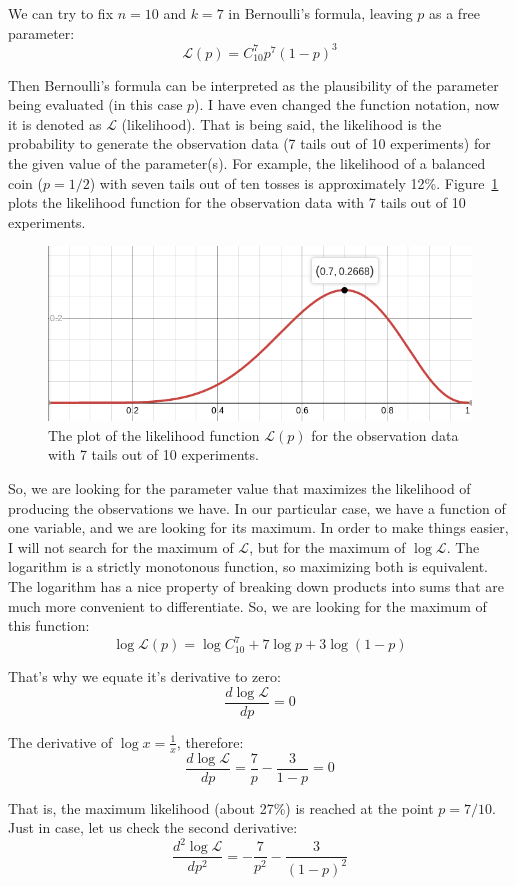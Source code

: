 \documentclass[notitlepage,oneside]{book}
\begin{document}
We can try to fix $n=10$ and $k=7$ in Bernoulli's formula, leaving $p$ as a free parameter:
$$\mathcal{L}(p) = C_{10}^7 p^7 (1-p)^3$$

Then Bernoulli's formula can be interpreted as the plausibility of the parameter being evaluated (in this case $p$).
I have even changed the function notation, now it is denoted as $\mathcal L$ (likelihood).
That is being said, the likelihood is the probability to generate the observation data (7 tails out of 10 experiments) for the given value of the parameter(s).
For example, the likelihood of a balanced coin ($p=1/2$) with seven tails out of ten tosses is approximately 12\%. 
Figure~\ref{fig:likelihood} plots the likelihood function for the observation data with 7 tails out of 10 experiments.

\begin{figure}[htb!]
\centering
\includegraphics[width=.5\columnwidth]{img/likehood-07.png}
\caption{The plot of the likelihood function $\mathcal{L}(p)$ for the observation data with 7 tails out of 10 experiments.}
\label{fig:likelihood}
\end{figure}

So, we are looking for the parameter value that maximizes the likelihood of producing the observations we have.
In our particular case, we have a function of one variable, and we are looking for its maximum.
In order to make things easier, I will not search for the maximum of $\mathcal L$, but for the maximum of $\log \mathcal L$.
The logarithm is a strictly monotonous function, so maximizing both is equivalent.
The logarithm has a nice property of breaking down products into sums that are much more convenient to differentiate.
So, we are looking for the maximum of this function:
$$\log \mathcal{L}(p) = \log C_{10}^7 + 7 \log p + 3\log (1-p)$$

That's why we equate it's derivative to zero:
$$\frac{d \log \mathcal{L}}{dp} = 0$$

The derivative of $\log x = \frac{1}{x}$, therefore:
$$\frac{d \log \mathcal{L}}{dp} = \frac{7}{p} - \frac{3}{1-p} = 0$$

That is, the maximum likelihood (about 27\%) is reached at the point $p=7/10$.
Just in case, let us check the second derivative:
$$\frac{d^2 \log \mathcal{L}}{dp^2} = -\frac{7}{p^2} - \frac{3}{(1-p)^2}$$
\end{document}
